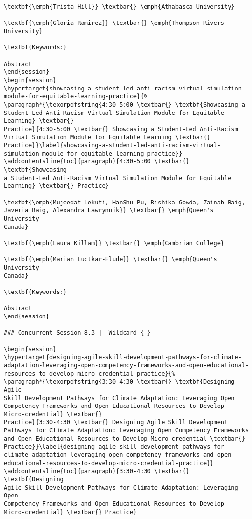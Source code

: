 \documentclass[
]{book}
\begin{document}
\begin{verbatim}
\textbf{\emph{Trista Hill}} \textbar{} \emph{Athabasca University}

\textbf{\emph{Gloria Ramirez}} \textbar{} \emph{Thompson Rivers
University}

\textbf{Keywords:}

Abstract
\end{session}
\begin{session}
\hypertarget{showcasing-a-student-led-anti-racism-virtual-simulation-module-for-equitable-learning-practice}{%
\paragraph*{\texorpdfstring{4:30-5:00 \textbar{} \textbf{Showcasing a
Student-Led Anti-Racism Virtual Simulation Module for Equitable
Learning} \textbar{}
Practice}{4:30-5:00 \textbar{} Showcasing a Student-Led Anti-Racism Virtual Simulation Module for Equitable Learning \textbar{} Practice}}\label{showcasing-a-student-led-anti-racism-virtual-simulation-module-for-equitable-learning-practice}}
\addcontentsline{toc}{paragraph}{4:30-5:00 \textbar{} \textbf{Showcasing
a Student-Led Anti-Racism Virtual Simulation Module for Equitable
Learning} \textbar{} Practice}

\textbf{\emph{Mujeedat Lekuti, HanShu Pu, Rishika Gowda, Zainab Baig,
Javeria Baig, Alexandra Lawrynuik}} \textbar{} \emph{Queen's University
Canada}

\textbf{\emph{Laura Killam}} \textbar{} \emph{Cambrian College}

\textbf{\emph{Marian Luctkar-Flude}} \textbar{} \emph{Queen's University
Canada}

\textbf{Keywords:}

Abstract
\end{session}

### Concurrent Session 8.3 |  Wildcard {-}

\begin{session}
\hypertarget{designing-agile-skill-development-pathways-for-climate-adaptation-leveraging-open-competency-frameworks-and-open-educational-resources-to-develop-micro-credential-practice}{%
\paragraph*{\texorpdfstring{3:30-4:30 \textbar{} \textbf{Designing Agile
Skill Development Pathways for Climate Adaptation: Leveraging Open
Competency Frameworks and Open Educational Resources to Develop
Micro-credential} \textbar{}
Practice}{3:30-4:30 \textbar{} Designing Agile Skill Development Pathways for Climate Adaptation: Leveraging Open Competency Frameworks and Open Educational Resources to Develop Micro-credential \textbar{} Practice}}\label{designing-agile-skill-development-pathways-for-climate-adaptation-leveraging-open-competency-frameworks-and-open-educational-resources-to-develop-micro-credential-practice}}
\addcontentsline{toc}{paragraph}{3:30-4:30 \textbar{} \textbf{Designing
Agile Skill Development Pathways for Climate Adaptation: Leveraging Open
Competency Frameworks and Open Educational Resources to Develop
Micro-credential} \textbar{} Practice}


\end{verbatim}
\end{document}
